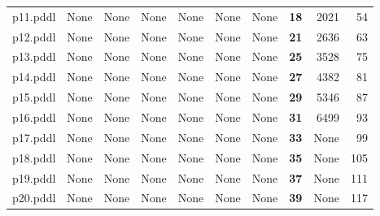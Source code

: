 \documentclass{article}
\begin{document}
\begin{tabular}{@{}lrrrrrrrrr@{}}
p11.pddl & \multicolumn{1}{|l|}{None} & \multicolumn{1}{|l|}{None} & \multicolumn{1}{|l|}{None} & \multicolumn{1}{|l|}{None} & \multicolumn{1}{|l|}{None} & \multicolumn{1}{|l|}{None} & \textbf{18} & 2021 & 54 \\
p12.pddl & \multicolumn{1}{|l|}{None} & \multicolumn{1}{|l|}{None} & \multicolumn{1}{|l|}{None} & \multicolumn{1}{|l|}{None} & \multicolumn{1}{|l|}{None} & \multicolumn{1}{|l|}{None} & \textbf{21} & 2636 & 63 \\
p13.pddl & \multicolumn{1}{|l|}{None} & \multicolumn{1}{|l|}{None} & \multicolumn{1}{|l|}{None} & \multicolumn{1}{|l|}{None} & \multicolumn{1}{|l|}{None} & \multicolumn{1}{|l|}{None} & \textbf{25} & 3528 & 75 \\
p14.pddl & \multicolumn{1}{|l|}{None} & \multicolumn{1}{|l|}{None} & \multicolumn{1}{|l|}{None} & \multicolumn{1}{|l|}{None} & \multicolumn{1}{|l|}{None} & \multicolumn{1}{|l|}{None} & \textbf{27} & 4382 & 81 \\
p15.pddl & \multicolumn{1}{|l|}{None} & \multicolumn{1}{|l|}{None} & \multicolumn{1}{|l|}{None} & \multicolumn{1}{|l|}{None} & \multicolumn{1}{|l|}{None} & \multicolumn{1}{|l|}{None} & \textbf{29} & 5346 & 87 \\
p16.pddl & \multicolumn{1}{|l|}{None} & \multicolumn{1}{|l|}{None} & \multicolumn{1}{|l|}{None} & \multicolumn{1}{|l|}{None} & \multicolumn{1}{|l|}{None} & \multicolumn{1}{|l|}{None} & \textbf{31} & 6499 & 93 \\
p17.pddl & \multicolumn{1}{|l|}{None} & \multicolumn{1}{|l|}{None} & \multicolumn{1}{|l|}{None} & \multicolumn{1}{|l|}{None} & \multicolumn{1}{|l|}{None} & \multicolumn{1}{|l|}{None} & \textbf{33} & \multicolumn{1}{|l|}{None} & 99 \\
p18.pddl & \multicolumn{1}{|l|}{None} & \multicolumn{1}{|l|}{None} & \multicolumn{1}{|l|}{None} & \multicolumn{1}{|l|}{None} & \multicolumn{1}{|l|}{None} & \multicolumn{1}{|l|}{None} & \textbf{35} & \multicolumn{1}{|l|}{None} & 105 \\
p19.pddl & \multicolumn{1}{|l|}{None} & \multicolumn{1}{|l|}{None} & \multicolumn{1}{|l|}{None} & \multicolumn{1}{|l|}{None} & \multicolumn{1}{|l|}{None} & \multicolumn{1}{|l|}{None} & \textbf{37} & \multicolumn{1}{|l|}{None} & 111 \\
p20.pddl & \multicolumn{1}{|l|}{None} & \multicolumn{1}{|l|}{None} & \multicolumn{1}{|l|}{None} & \multicolumn{1}{|l|}{None} & \multicolumn{1}{|l|}{None} & \multicolumn{1}{|l|}{None} & \textbf{39} & \multicolumn{1}{|l|}{None} & 117 \\
\end{tabular}
\end{document}
